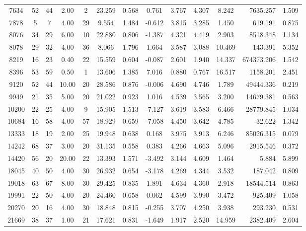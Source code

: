 \documentclass[mnsc]{informs3}
\begin{document}
\begin{APPENDICES}
\begin{longtable}{cccccccccccrc}
7634 & 52 & 44 & 2.00 & 2 & 23.259 & 0.568 & 0.761 & 3.767 & 4.307 & 8.242 & 7635.257 & 1.509 \\
7878 & 5 & 7 & 4.00 & 29 & 9.554 & 1.484 & -0.612 & 3.815 & 3.285 & 1.450 & 619.191 & 0.875 \\
8076 & 34 & 29 & 6.00 & 10 & 22.880 & 0.806 & -1.387 & 4.321 & 4.419 & 2.903 & 8518.348 & 1.134 \\
8078 & 29 & 32 & 4.00 & 36 & 8.066 & 1.796 & 1.664 & 3.587 & 3.088 & 10.469 & 143.391 & 5.352 \\
8219 & 16 & 23 & 0.40 & 22 & 15.559 & 0.604 & -0.087 & 2.601 & 1.940 & 14.337 & 674373.206 & 1.542 \\
8396 & 53 & 59 & 0.50 & 1 & 13.606 & 1.385 & 7.016 & 0.880 & 0.767 & 16.517 & 1158.201 & 2.451 \\
9120 & 52 & 44 & 10.00 & 20 & 28.586 & 0.876 & -0.006 & 4.690 & 4.746 & 1.789 & 49444.336 & 0.219 \\
9949 & 21 & 35 & 5.00 & 20 & 21.022 & 0.923 & 1.016 & 4.539 & 3.565 & 3.200 & 14679.381 & 0.563 \\
10200 & 22 & 25 & 4.00 & 9 & 15.905 & 1.513 & -7.127 & 3.619 & 3.583 & 6.466 & 28779.845 & 1.034 \\
10684 & 16 & 58 & 4.00 & 57 & 18.929 & 0.659 & -7.058 & 4.450 & 3.642 & 4.785 & 32.622 & 1.342 \\
13333 & 18 & 19 & 2.00 & 25 & 19.948 & 0.638 & 0.168 & 3.975 & 3.913 & 6.246 & 85026.315 & 0.079 \\
14242 & 68 & 37 & 3.00 & 20 & 31.135 & 0.558 & 0.383 & 4.266 & 4.663 & 5.096 & 2915.546 & 0.372 \\
14420 & 56 & 20 & 20.00 & 22 & 13.393 & 1.571 & -3.492 & 3.144 & 4.609 & 1.464 & 5.884 & 5.899 \\
18045 & 40 & 50 & 4.00 & 30 & 26.932 & 0.654 & -3.178 & 4.269 & 4.344 & 3.532 & 187.042 & 0.809 \\
19018 & 63 & 67 & 8.00 & 30 & 29.425 & 0.835 & 1.891 & 4.634 & 4.360 & 2.918 & 18544.514 & 0.863 \\
19991 & 22 & 50 & 4.00 & 20 & 24.460 & 0.658 & 0.062 & 4.599 & 3.990 & 3.472 & 925.409 & 1.058 \\
20270 & 20 & 16 & 4.00 & 30 & 18.848 & 0.815 & -0.255 & 3.707 & 4.250 & 3.938 & 293.230 & 0.531 \\
21669 & 38 & 37 & 1.00 & 21 & 17.621 & 0.831 & -1.649 & 1.917 & 2.520 & 14.959 & 2382.409 & 2.604 \\

\end{longtable}
\end{APPENDICES}
\end{document}
